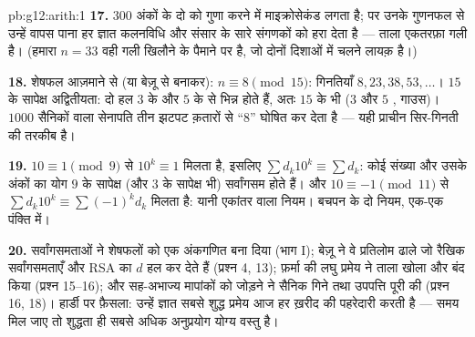 \begin{solution}{pb:g12:arith:1}
\textbf{17.} $300$ अंकों के दो  को गुणा करने में माइक्रोसेकंड लगता
है; पर उनके गुणनफल से उन्हें वापस पाना हर ज्ञात कलनविधि और संसार के सारे
संगणकों को हरा देता है --- ताला एकतरफ़ा गली है। (हमारा $n = 33$ वही गली खिलौने
के पैमाने पर है, जो दोनों दिशाओं में चलने लायक़ है।)

\textbf{18.} शेषफल आज़माने से (या बेज़ू से बनाकर): $n \equiv 8 \pmod{15}$: गिनतियाँ $8, 23, 38, 53, \dots$।
$15$ के सापेक्ष अद्वितीयता: दो हल $3$ के और $5$ के  से भिन्न होते
हैं, अतः $15$ के भी ($3$ और $5$ , गाउस)। $1000$ सैनिकों वाला
सेनापति तीन झटपट क़तारों से ``$8$'' घोषित कर देता है --- यही प्राचीन
सिर-गिनती की तरकीब है।

\textbf{19.} $10 \equiv 1 \pmod 9$ से $10^k \equiv 1$ मिलता है, इसलिए $\sum d_k 10^k \equiv \sum d_k$: कोई संख्या और उसके अंकों
का योग $9$ के सापेक्ष (और $3$ के सापेक्ष भी) सर्वांगसम होते हैं। और $10 \equiv -1 \pmod{11}$
से $\sum d_k 10^k \equiv \sum (-1)^k d_k$ मिलता है: यानी एकांतर वाला नियम। बचपन के दो नियम, एक-एक पंक्ति में।

\textbf{20.} सर्वांगसमताओं ने शेषफलों को एक अंकगणित बना दिया (भाग I); बेज़ू
ने वे प्रतिलोम ढाले जो रैखिक सर्वांगसमताएँ और RSA का $d$ हल कर देते हैं
(प्रश्न 4, 13); फ़र्मा की लघु प्रमेय ने ताला खोला और बंद किया (प्रश्न
15--16); और सह-अभाज्य मापांकों को जोड़ने ने सैनिक गिने तथा उपपत्ति पूरी की
(प्रश्न 16, 18)। हार्डी पर फ़ैसला: उन्हें ज्ञात सबसे शुद्ध प्रमेय आज हर
ख़रीद की पहरेदारी करती है --- समय मिल जाए तो शुद्धता ही सबसे अधिक अनुप्रयोग
योग्य वस्तु है।
\end{solution}
